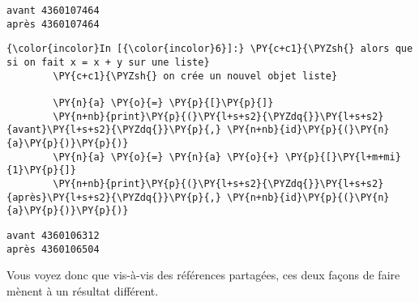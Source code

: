     \begin{Verbatim}[commandchars=\\\{\},frame=single,framerule=0.3mm,rulecolor=\color{cellframecolor}]
avant 4360107464
après 4360107464
\end{Verbatim}

    \begin{Verbatim}[commandchars=\\\{\},frame=single,framerule=0.3mm,rulecolor=\color{cellframecolor}]
{\color{incolor}In [{\color{incolor}6}]:} \PY{c+c1}{\PYZsh{} alors que si on fait x = x + y sur une liste}
        \PY{c+c1}{\PYZsh{} on crée un nouvel objet liste}
        
        \PY{n}{a} \PY{o}{=} \PY{p}{[}\PY{p}{]}
        \PY{n+nb}{print}\PY{p}{(}\PY{l+s+s2}{\PYZdq{}}\PY{l+s+s2}{avant}\PY{l+s+s2}{\PYZdq{}}\PY{p}{,} \PY{n+nb}{id}\PY{p}{(}\PY{n}{a}\PY{p}{)}\PY{p}{)}
        \PY{n}{a} \PY{o}{=} \PY{n}{a} \PY{o}{+} \PY{p}{[}\PY{l+m+mi}{1}\PY{p}{]}
        \PY{n+nb}{print}\PY{p}{(}\PY{l+s+s2}{\PYZdq{}}\PY{l+s+s2}{après}\PY{l+s+s2}{\PYZdq{}}\PY{p}{,} \PY{n+nb}{id}\PY{p}{(}\PY{n}{a}\PY{p}{)}\PY{p}{)}
\end{Verbatim}


    \begin{Verbatim}[commandchars=\\\{\},frame=single,framerule=0.3mm,rulecolor=\color{cellframecolor}]
avant 4360106312
après 4360106504
\end{Verbatim}

    Vous voyez donc que vis-à-vis des références partagées, ces deux façons
de faire mènent à un résultat différent.


    
    
    
